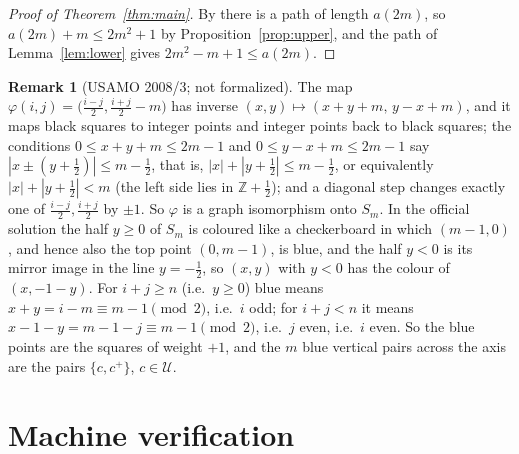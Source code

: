 \documentclass[11pt]{amsart}
\theoremstyle{plain}
\theoremstyle{definition}
\newtheorem{remark}[theorem]{Remark}
\newcommand{\cU}{\mathcal{U}}
\begin{document}
\begin{proof}[Proof of Theorem~\ref{thm:main}]
By  there is a path of length $a(2m)$, so $a(2m)+m\le 2m^2+1$ by Proposition~\ref{prop:upper}, and the path of Lemma~\ref{lem:lower} gives $2m^2-m+1\le a(2m)$.
\end{proof}

\begin{remark}[USAMO 2008/3; not formalized]\label{rem:usamo}
The map $\varphi(i,j)=\bigl(\frac{i-j}{2},\frac{i+j}{2}-m\bigr)$ has inverse $(x,y)\mapsto(x+y+m,\,y-x+m)$, and it maps black squares to integer points and integer points back to black squares; the conditions $0\le x+y+m\le 2m-1$ and $0\le y-x+m\le 2m-1$ say $|x\pm(y+\frac12)|\le m-\frac12$, that is, $|x|+|y+\frac12|\le m-\frac12$, or equivalently $|x|+|y+\frac12|<m$ (the left side lies in $\mathbb Z+\frac12$); and a diagonal step changes exactly one of $\frac{i-j}{2},\frac{i+j}{2}$ by $\pm1$. So $\varphi$ is a graph isomorphism onto $S_m$. In the official solution \cite{ChenUSAMO} the half $y\ge0$ of $S_m$ is coloured like a checkerboard in which $(m-1,0)$, and hence also the top point $(0,m-1)$, is blue, and the half $y<0$ is its mirror image in the line $y=-\frac12$, so $(x,y)$ with $y<0$ has the colour of $(x,-1-y)$. For $i+j\ge n$ (i.e.\ $y\ge0$) blue means $x+y=i-m\equiv m-1\pmod 2$, i.e.\ $i$ odd; for $i+j<n$ it means $x-1-y=m-1-j\equiv m-1\pmod 2$, i.e.\ $j$ even, i.e.\ $i$ even. So the blue points are the squares of weight $+1$, and the $m$ blue vertical pairs across the axis are the pairs $\{c,c^+\}$, $c\in\cU$.
\end{remark}

\section{Machine verification}\label{sec:lean}
\end{document}
